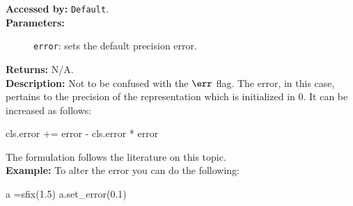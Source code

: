 			\textbf{Accessed by:} \verb|Default|.		 \\
			\textbf{Parameters:}
			\begin{description}
				\item[]\verb|error|:  sets the default precision error. 
			\end{description}
			\textbf{Returns:} N/A. \\
			\textbf{Description:} Not to be confused with the 
$\err$ flag. The error, in this case, pertains to the precision of the representation which is initialized in 0. It can be increased as follows:
			\begin{mylisting}							
					cls.error += error - cls.error * error
			\end{mylisting}
			The formulation follows the literature on this topic. \\
			\textbf{Example:}      
			To alter the error you can do the following:
			\begin{mylisting}
				a =sfix(1.5)
				a.set_error(0.1)
			\end{mylisting}
		
